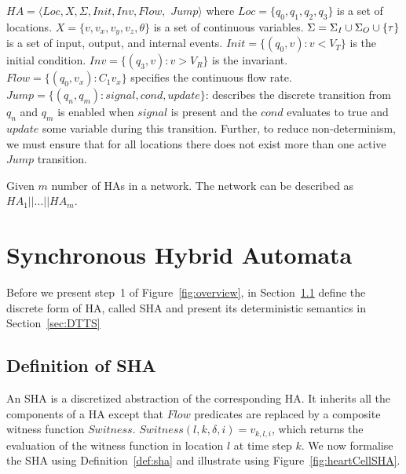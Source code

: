 \begin{definition}
	\label{def:ha}
	 $HA = \langle Loc, X, \Sigma, Init, Inv, Flow,$ $ Jump \rangle$ where
	$Loc=\{q_0,q_1,q_2,q_3\}$ is a set of locations.
	$X=\{v,v_x,v_y,v_z,\theta\}$ is a set of continuous variables.
	$\Sigma=\Sigma_I \cup \Sigma_O \cup \{\tau\}$ is a set of
	 input, output, and internal events.
	$Init=\{(q_0,v): v < V_T\}$ is the initial condition.
	$Inv=\{(q_3,v): v > V_R\}$ is the invariant.
	$Flow=\{(q_0,v_x): C_1 v_x\}$ specifies the continuous flow rate.
	$Jump=\{(q_n, q_m): signal, cond, update\}$: describes the discrete
	transition from $q_n$ and $q_m$ is enabled when $signal$ is 
	present and the $cond$ evaluates to true and $update$
	some variable during this transition.
	Further, to reduce non-determinism, we must ensure that
	for all locations there does not exist more than one 
	active $Jump$ transition.
\end{definition}

Given  $m$   number of \acp{HA} in a network.
The network can be described as $HA_1 || \dots || HA_m$.


\section{Synchronous Hybrid Automata}
\label{sec:SHA}
 
Before we present step~1 of Figure~\ref{fig:overview},
in Section~\ref{sec:defSHA} define the discrete form of \ac{HA}, 
called \acf{SHA} and present its deterministic semantics in 
Section~\ref{sec:DTTS}

\subsection{Definition of \acf{SHA}}
\label{sec:defSHA}
An \ac{SHA} is a discretized  abstraction of the corresponding \ac{HA}. 
It inherits all the
components of a \ac{HA} except that $Flow$ predicates are replaced by a
composite witness function $Switness$.
$Switness(l,k, \delta, i)=v_{k,l,i}$, which returns the evaluation of
the witness function in location $l$ at time step $k$.
We now formalise
the \ac{SHA} using Definition~\ref{def:sha} and illustrate using Figure~\ref{fig:heartCellSHA}.




